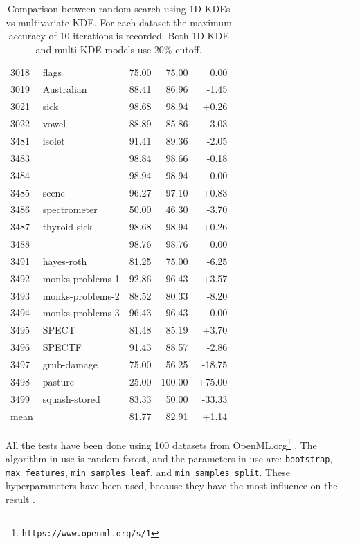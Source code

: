 \documentclass{article}
\begin{document}
\begin{table}[ht]
\begin{tabular}{llrrr}
        3018 & flags & 75.00 & 75.00 & 0.00 \\
        3019 & Australian & 88.41 & 86.96 & -1.45 \\
        3021 & sick & 98.68 & 98.94 & +0.26 \\
        3022 & vowel & 88.89 & 85.86 & -3.03 \\
        3481 & isolet & 91.41 & 89.36 & -2.05 \\
        3483 &  & 98.84 & 98.66 & -0.18 \\
        3484 &  & 98.94 & 98.94 & 0.00 \\
        3485 & scene & 96.27 & 97.10 & +0.83 \\
        3486 & spectrometer & 50.00 & 46.30 & -3.70 \\
        3487 & thyroid-sick & 98.68 & 98.94 & +0.26 \\
        3488 &  & 98.76 & 98.76 & 0.00 \\
        3491 & hayes-roth & 81.25 & 75.00 & -6.25 \\
        3492 & monks-problems-1 & 92.86 & 96.43 & +3.57 \\
        3493 & monks-problems-2 & 88.52 & 80.33 & -8.20 \\
        3494 & monks-problems-3 & 96.43 & 96.43 & 0.00 \\
        3495 & SPECT & 81.48 & 85.19 & +3.70 \\
        3496 & SPECTF & 91.43 & 88.57 & -2.86 \\
        3497 & grub-damage & 75.00 & 56.25 & -18.75 \\
        3498 & pasture & 25.00 & 100.00 & +75.00 \\
        3499 & squash-stored & 83.33 & 50.00 & -33.33 \\
        \hline
        mean & & 81.77 & 82.91 & +1.14 \\
        \hline
    \end{tabular}
    \caption{Comparison between random search using 1D KDEs vs multivariate KDE. For each dataset the maximum accuracy of 10 iterations is recorded. Both 1D-KDE and multi-KDE models use 20\% cutoff.}
    \label{tab:result}
\end{table}

All the tests have been done using 100 datasets from OpenML.org\footnote{\texttt{https://www.openml.org/s/1}} \cite{OpenML1, OpenML2}. The algorithm in use is random forest, and the parameters in use are: \texttt{bootstrap}, \texttt{max\_features}, \texttt{min\_samples\_leaf}, and \texttt{min\_samples\_split}. These hyperparameters have been used, because they have the most influence on the result \cite{Rijn2017AnES}.
\end{document}
